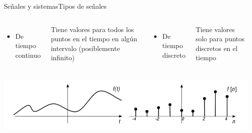     \begin{frame}{Señales y sistemas}{Tipos de señales}
      \begin{columns}[onlytextwidth]
            \begin{itemize}
               \item{De tiempo continuo}
      \end{itemize}
            Tiene valores para todos los puntos en el tiempo en algún intervalo (posiblemente infinito)
            \begin{itemize}
               \item{De tiempo discreto}
            \end{itemize}
         Tiene valores solo para puntos discretos en el tiempo
         \end{columns}
      \vfill
      \includegraphics[width=\textwidth]{1_clase/continuo_vs_discreto}
    \end{frame}

